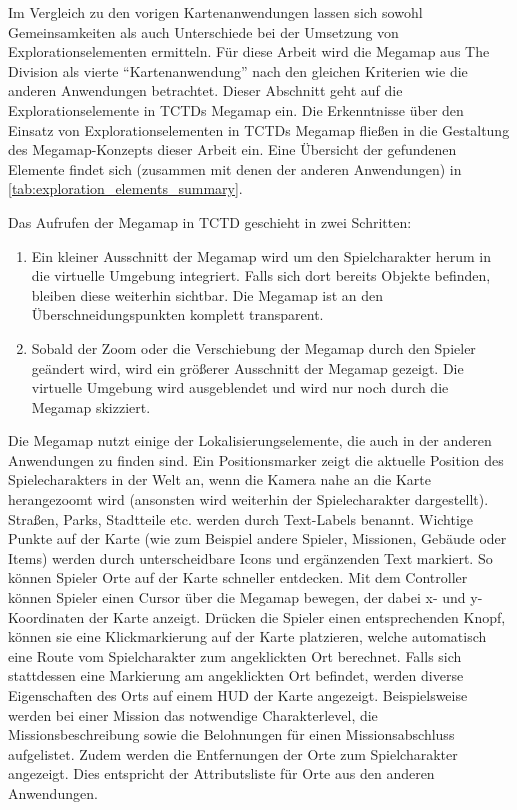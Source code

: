 Im Vergleich zu den vorigen Kartenanwendungen lassen sich sowohl Gemeinsamkeiten als auch Unterschiede bei der Umsetzung von Explorationselementen ermitteln.
Für diese Arbeit wird die Megamap aus The Division als vierte \enquote{Kartenanwendung} nach den gleichen Kriterien wie die anderen Anwendungen betrachtet.
Dieser Abschnitt geht auf die Explorationselemente in TCTDs Megamap ein.
Die Erkenntnisse über den Einsatz von Explorationselementen in TCTDs Megamap fließen in die Gestaltung des Megamap-Konzepts dieser Arbeit ein.
Eine Übersicht der gefundenen Elemente findet sich (zusammen mit denen der anderen Anwendungen) in \autoref{tab:exploration_elements_summary}.

Das Aufrufen der Megamap in TCTD geschieht in zwei Schritten:
\begin{enumerate}
    \item Ein kleiner Ausschnitt der Megamap wird um den Spielcharakter herum in die virtuelle Umgebung integriert.
    Falls sich dort bereits Objekte befinden, bleiben diese weiterhin sichtbar.
    Die Megamap ist an den Überschneidungspunkten komplett transparent.
    \item Sobald der Zoom oder die Verschiebung der Megamap durch den Spieler geändert wird, wird ein größerer Ausschnitt der Megamap gezeigt.
    Die virtuelle Umgebung wird ausgeblendet und wird nur noch durch die Megamap skizziert.
\end{enumerate}

Die Megamap nutzt einige der Lokalisierungselemente, die auch in der anderen Anwendungen zu finden sind.
Ein Positionsmarker zeigt die aktuelle Position des Spielecharakters in der Welt an, wenn die Kamera nahe an die Karte herangezoomt wird (ansonsten wird weiterhin der Spielecharakter dargestellt).
Straßen, Parks, Stadtteile etc. werden durch Text-Labels benannt.
Wichtige Punkte auf der Karte (wie zum Beispiel andere Spieler, Missionen, Gebäude oder Items) werden durch unterscheidbare Icons und ergänzenden Text markiert.
So können Spieler Orte auf der Karte schneller entdecken.
Mit dem Controller können Spieler einen Cursor über die Megamap bewegen, der dabei x- und y-Koordinaten der Karte anzeigt.
Drücken die Spieler einen entsprechenden Knopf, können sie eine Klickmarkierung auf der Karte platzieren, welche automatisch eine Route vom Spielcharakter zum angeklickten Ort berechnet.
Falls sich stattdessen eine Markierung am angeklickten Ort befindet, werden diverse Eigenschaften des Orts auf einem HUD der Karte angezeigt.
Beispielsweise werden bei einer Mission das notwendige Charakterlevel, die Missionsbeschreibung sowie die Belohnungen für einen Missionsabschluss aufgelistet.
Zudem werden die Entfernungen der Orte zum Spielcharakter angezeigt.
Dies entspricht der Attributsliste für Orte aus den anderen Anwendungen.


